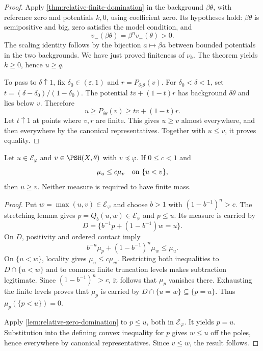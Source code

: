 \begin{proof}
Apply \cref{thm:relative-finite-domination} in the background $\beta\theta$, with reference zero and potentials $k,0$, using coefficient zero. Its hypotheses hold: $\beta\theta$ is semipositive and big, zero satisfies the model condition, and
\[
 v_-(\beta\theta)=\beta^n v_-(\theta)>0.
\]
The scaling identity follows by the bijection $a\mapsto\beta a$ between bounded potentials in the two backgrounds. We have just proved finiteness of $\nu_k$. The theorem yields $k\geq0$, hence $u\geq q$.

To pass to $\delta\uparrow1$, fix $\delta_0\in(\varepsilon,1)$ and $r=P_{\delta_0\theta}(v)$. For $\delta_0<\delta<1$, set $t=(\delta-\delta_0)/(1-\delta_0)$. The potential $t v+(1-t)r$ has background $\delta\theta$ and lies below $v$. Therefore
\[
 u\geq P_{\delta\theta}(v)\geq t v+(1-t)r.
\]
Let $t\uparrow1$ at points where $v,r$ are finite. This gives $u\geq v$ almost everywhere, and then everywhere by the canonical representatives. Together with $u\leq v$, it proves equality.
\end{proof}

\begin{theorem}\label{thm:relative-extended-domination}
Let $u\in\mathcal E_\varphi$ and $v\in\PSH(X,\theta)$ with $v\preceq\varphi$. If $0\leq c<1$ and
\[
 \mu_u\leq c\mu_v\quad\hbox{on }\{u<v\},
\]
then $u\geq v$. Neither measure is required to have finite mass.
\end{theorem}
\begin{proof}
Put $w=\max(u,v)\in\mathcal E_\varphi$ and choose $b>1$ with $(1-b^{-1})^n>c$. The stretching lemma gives $p=Q_b(u,w)\in\mathcal E_\varphi$ and $p\leq u$. Its measure is carried by
\[
 D=\{b^{-1}p+(1-b^{-1})w=u\}.
\]
On $D$, positivity and ordered contact imply
\[
 b^{-n}\mu_p+(1-b^{-1})^n\mu_w\leq\mu_u.
\]
On $\{u<w\}$, locality gives $\mu_u\leq c\mu_w$. Restricting both inequalities to $D\cap\{u<w\}$ and to common finite truncation levels makes subtraction legitimate. Since $(1-b^{-1})^n>c$, it follows that $\mu_p$ vanishes there. Exhausting the finite levels proves that $\mu_p$ is carried by $D\cap\{u=w\}\subseteq\{p=u\}$. Thus $\mu_p(\{p<u\})=0$.

Apply \cref{lem:relative-zero-domination} to $p\leq u$, both in $\mathcal E_\varphi$. It yields $p=u$. Substitution into the defining convex inequality for $p$ gives $w\leq u$ off the poles, hence everywhere by canonical representatives. Since $v\leq w$, the result follows.
\end{proof}

